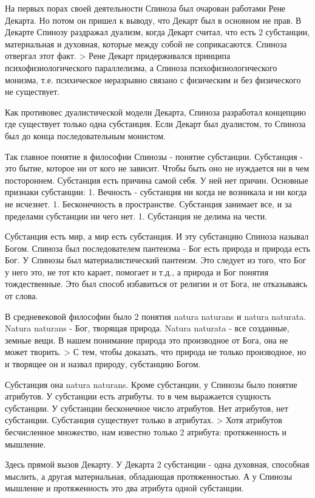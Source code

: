 На первых порах своей деятельности Спиноза был очарован работами Рене Декарта. Но потом он пришел к выводу, что Декарт был в основном не прав. В Декарте Спинозу раздражал дуализм, когда Декарт считал, что есть 2 субстанции, материальная и духовная, которые между собой не соприкасаются. Спиноза отвергал этот факт. > Рене Декарт придерживался принципа психофизиологического параллелизма, а Спиноза психофизиологического монизма, т.е. психическое неразрывно связано с физическим и без физического не существует.

Как противовес дуалистической модели Декарта, Спиноза разработал концепцию где существует только одна субстанция. Если Декарт был дуалистом, то Спиноза был до конца последовательным монистом.

    Так главное понятие в философии Спинозы - понятие субстанции. Субстанция - это бытие, которое ни от кого не зависит. Чтобы быть оно не нуждается ни в чем постороннем. Субстанция есть причина самой себя. У ней нет причин. Основные признаки субстанции: 1. Вечность - субстанция ни когда не возникала и ни когда не исчезнет. 1. Бесконечность в пространстве. Субстанция занимает все, и за пределами субстанции ни чего нет. 1. Субстанция не делима на чести.

Субстанция есть мир, а мир есть субстанция. И эту субстанцию Спиноза называл Богом. Спиноза был последователем пантеизма - Бог есть природа и природа есть Бог. У Спинозы был материалистический пантеизм. Это следует из того, что Бог у него это, не тот кто карает, помогает и т.д., а природа и Бог понятия тождественные. Это был способ избавиться от религии и от Бога, не отказываясь от слова.

В средневековой философии было 2 понятия natura naturans и natura naturata. Natura naturans - Бог, творящая природа. Natura naturata - все созданные, земные вещи. В нашем понимание природа это производное от Бога, она не может творить. > С тем, чтобы доказать, что природа не только производное, но и творящее он и назвал природу, субстанцию Богом.

Субстанция она natura naturans. Кроме субстанции, у Спинозы было понятие атрибутов. У субстанции есть атрибуты. то в чем выражается сущность субстанции. У субстанции бесконечное число атрибутов. Нет атрибутов, нет субстанции. Субстанция существует только в атрибутах. > Хотя атрибутов бесчисленное множество, нам известно только 2 атрибута: протяженность и мышление.

Здесь прямой вызов Декарту. У Декарта 2 субстанции - одна духовная, способная мыслить, а другая материальная, обладающая протяженностью. А у Спинозы мышление и протяженность это два атрибута одной субстанции.

